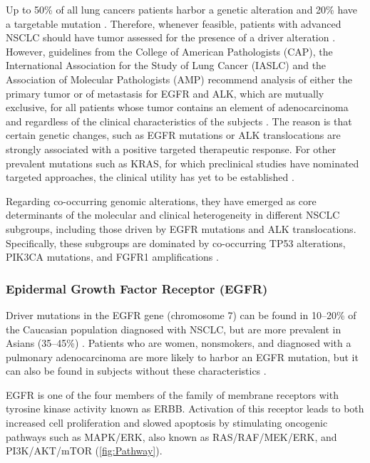 Up to 50\% of all lung cancers patients harbor a genetic alteration and 20\% have a targetable mutation \cite{NSCLC_profiling}. Therefore, whenever feasible, patients with advanced NSCLC should have tumor assessed for the presence of a driver alteration \cite{Mol_guideline_1}. However, guidelines from the College of American Pathologists (CAP), the International Association for the Study of Lung Cancer (IASLC) and the Association of Molecular Pathologists (AMP) recommend analysis of either the primary tumor or of metastasis for EGFR and ALK, which are mutually exclusive, for all patients whose tumor contains an element of adenocarcinoma and regardless of the clinical characteristics of the subjects \cite{Mol_guideline_1, Mol_guideline_2}. The reason is that certain genetic changes, such as EGFR mutations or ALK translocations are strongly associated with a positive targeted therapeutic response. For other prevalent mutations such as KRAS, for which preclinical studies have nominated targeted approaches, the clinical utility has yet to be established \cite{KRAS}.

Regarding co-occurring genomic alterations, they have emerged as core  determinants of the molecular and clinical heterogeneity in different NSCLC subgroups, including those driven by EGFR mutations and ALK translocations. Specifically, these subgroups are dominated by co-occurring TP53 alterations, PIK3CA mutations, and FGFR1 amplifications \cite{NSCLC_alterations}.

\subsubsection{Epidermal Growth Factor Receptor (EGFR)}

Driver mutations in the EGFR gene (chromosome 7) can be found in 10–20\% of the Caucasian population diagnosed with NSCLC, but are more prevalent in Asians (35–45\%) \cite{AD_drivers, AD_asian}. Patients who are women, nonsmokers, and diagnosed with a pulmonary adenocarcinoma are more likely to harbor an EGFR mutation, but it can also be found in subjects without these characteristics \cite{Mol_bio}.

EGFR is one of the four members of the family of membrane receptors with tyrosine kinase activity known as ERBB. Activation of this receptor leads to both increased cell proliferation and slowed apoptosis by stimulating oncogenic pathways such as MAPK\slash ERK, also known as RAS\slash RAF\slash MEK\slash ERK, and PI3K\slash AKT\slash mTOR (\autoref{fig:Pathway}).

